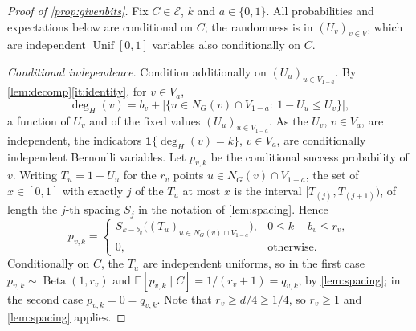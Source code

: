 \documentclass[11pt,a4paper]{article}
\theoremstyle{plain}
\theoremstyle{definition}
\theoremstyle{remark}
\newcommand{\EE}{\mathbb E}
\newcommand{\ind}{\mathbf 1}
\newcommand{\Unif}{\operatorname{Unif}}
\newcommand{\Beta}{\operatorname{Beta}}
\newcommand{\cE}{\mathcal E}
\newcommand{\degH}{\deg_H}
\begin{document}
\label{pf:givenbits}
\begin{proof}[Proof of \cref{prop:givenbits}]
Fix $C\in\cE$, $k$ and $a\in\{0,1\}$. All probabilities and expectations below are conditional on $C$; the randomness is in $(U_v)_{v\in V}$, which are independent $\Unif[0,1]$ variables also conditionally on $C$.

\emph{Conditional independence.} Condition additionally on $(U_u)_{u\in V_{1-a}}$. By \cref{lem:decomp}\ref{it:identity}, for $v\in V_a$,
\[
 \degH(v)=b_v+\bigl|\{u\in N_G(v)\cap V_{1-a}:\ 1-U_u\le U_v\}\bigr|,
\]
a function of $U_v$ and of the fixed values $(U_u)_{u\in V_{1-a}}$. As the $U_v$, $v\in V_a$, are independent, the indicators $\ind\{\degH(v)=k\}$, $v\in V_a$, are conditionally independent Bernoulli variables. Let $p_{v,k}$ be the conditional success probability of $v$. Writing $T_u=1-U_u$ for the $r_v$ points $u\in N_G(v)\cap V_{1-a}$, the set of $x\in[0,1]$ with exactly $j$ of the $T_u$ at most $x$ is the interval $[T_{(j)},T_{(j+1)})$, of length the $j$-th spacing $S_j$ in the notation of \cref{lem:spacing}. Hence
\[
 p_{v,k}=\begin{cases}S_{k-b_v}\bigl((T_u)_{u\in N_G(v)\cap V_{1-a}}\bigr),&0\le k-b_v\le r_v,\\ 0,&\text{otherwise.}\end{cases}
\]
Conditionally on $C$, the $T_u$ are independent uniforms, so in the first case $p_{v,k}\sim\Beta(1,r_v)$ and $\EE[p_{v,k}\mid C]=1/(r_v+1)=q_{v,k}$, by \cref{lem:spacing}; in the second case $p_{v,k}=0=q_{v,k}$. Note that $r_v\ge d/4\ge1/4$, so $r_v\ge1$ and \cref{lem:spacing} applies.


\end{proof}
\end{document}

